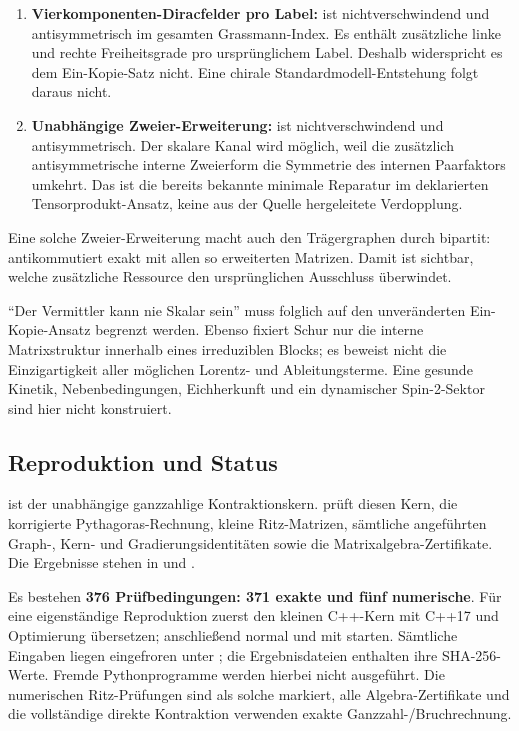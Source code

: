 \begin{enumerate}
\def\labelenumi{\arabic{enumi}.}
\tightlist
\item
  \textbf{Vierkomponenten-Diracfelder pro Label:} 
  ist nichtverschwindend und antisymmetrisch im gesamten
  Grassmann-Index. Es enthält zusätzliche linke und rechte
  Freiheitsgrade pro ursprünglichem Label. Deshalb widerspricht es dem
  Ein-Kopie-Satz nicht. Eine chirale Standardmodell-Entstehung folgt
  daraus nicht.
\item
  \textbf{Unabhängige Zweier-Erweiterung:}
   ist nichtverschwindend und
  antisymmetrisch. Der skalare Kanal wird möglich, weil die zusätzlich
  antisymmetrische interne Zweierform die Symmetrie des internen
  Paarfaktors umkehrt. Das ist die bereits bekannte minimale Reparatur
  im deklarierten Tensorprodukt-Ansatz, keine aus der Quelle
  hergeleitete Verdopplung.
\end{enumerate}

Eine solche Zweier-Erweiterung macht auch den Trägergraphen durch
 bipartit: 
antikommutiert exakt mit allen so erweiterten Matrizen. Damit ist
sichtbar, welche zusätzliche Ressource den ursprünglichen Ausschluss
überwindet.

``Der Vermittler kann nie Skalar sein'' muss folglich auf den
unveränderten Ein-Kopie-Ansatz begrenzt werden. Ebenso fixiert Schur nur
die interne Matrixstruktur innerhalb eines irreduziblen Blocks; es
beweist nicht die Einzigartigkeit aller möglichen Lorentz- und
Ableitungsterme. Eine gesunde Kinetik, Nebenbedingungen, Eichherkunft
und ein dynamischer Spin-2-Sektor sind hier nicht konstruiert.

\subsection{Reproduktion und Status}\label{reproduktion-und-status}

 ist der unabhängige ganzzahlige
Kontraktionskern.  prüft diesen Kern, die
korrigierte Pythagoras-Rechnung, kleine Ritz-Matrizen, sämtliche
angeführten Graph-, Kern- und Gradierungsidentitäten sowie die
Matrixalgebra-Zertifikate. Die Ergebnisse stehen in
 und .

Es bestehen \textbf{376 Prüfbedingungen: 371 exakte und fünf
numerische}. Für eine eigenständige Reproduktion zuerst den kleinen
C++-Kern mit C++17 und Optimierung übersetzen; anschließend
 normal und mit  starten. Sämtliche
Eingaben liegen eingefroren unter ; die
Ergebnisdateien enthalten ihre SHA-256-Werte. Fremde Pythonprogramme
werden hierbei nicht ausgeführt. Die numerischen Ritz-Prüfungen sind als
solche markiert, alle Algebra-Zertifikate und die vollständige direkte
Kontraktion verwenden exakte Ganzzahl-/Bruchrechnung.

